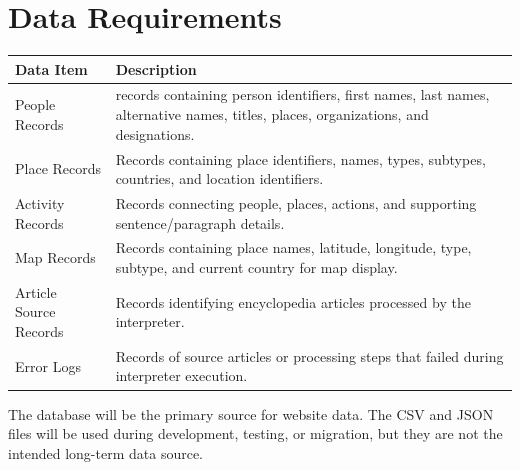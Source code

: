 \section{Data Requirements}

\begin{longtable}{|p{}|p{}|}
	\hline
	\textbf{Data Item}     & \textbf{Description}                                                                                                                \\
	\hline
	People Records         & records containing person identifiers, first names, last names, alternative names, titles, places, organizations, and designations. \\
	\hline
	Place Records          & Records containing place identifiers, names, types, subtypes, countries, and location identifiers.                                  \\
	\hline
	Activity Records       & Records connecting people, places, actions, and supporting sentence/paragraph details.                                              \\
	\hline
	Map Records            & Records containing place names, latitude, longitude, type, subtype, and current country for map display.                            \\
	\hline
	Article Source Records & Records identifying encyclopedia articles processed by the interpreter.                                                             \\
	\hline
	Error Logs             & Records of source articles or processing steps that failed during interpreter execution.                                            \\
	\hline
\end{longtable}

The database will be the primary source for website data. The CSV and JSON files will be used during development, testing, or migration, but they are not the intended long-term data source.

